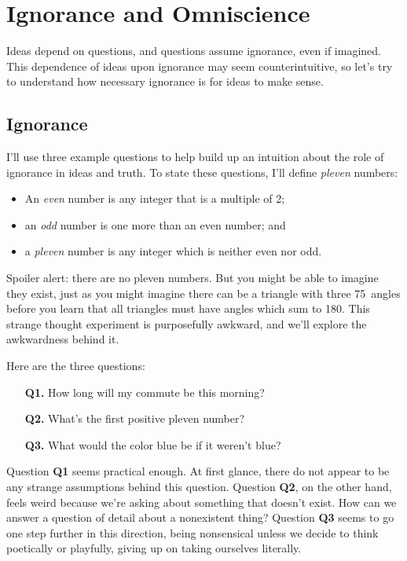 \documentclass[11pt, oneside]{article}
\theoremstyle{argtstyle}
\begin{document}
%
%
%
%
%


\section{Ignorance and Omniscience}

Ideas depend on questions,
and questions assume ignorance,
even if imagined.
This dependence of ideas upon ignorance
may seem counterintuitive, so
let's try to understand how necessary ignorance
is for ideas to make sense.

\subsection{Ignorance}

I'll use three example questions
to help build up an intuition about the role of
ignorance in ideas and truth.
To state these questions, I'll define
{\em pleven} numbers:
\begin{itemize}
    \item An {\em even} number is any integer that is a multiple of 2;
    \item an {\em odd} number is one more than an even number; and
    \item a {\em pleven} number is any integer which is neither even nor odd.
\end{itemize}
Spoiler
alert: there are no pleven numbers.
But you might be able to imagine they exist, just as you might imagine there can
be a triangle with three 75\degree\ angles before you learn that all triangles
must have angles which sum to 180\degree.
This strange thought experiment is purposefully awkward, and we'll
explore the awkwardness behind it.

Here are the three questions:
\begin{enumerate}
    \item[{\bf Q1.}] How long will my commute be this morning?
    \item[{\bf Q2.}] What's the first positive pleven number?
    \item[{\bf Q3.}] What would the color blue be if it weren't blue?
\end{enumerate}
Question {\bf Q1} seems practical enough. At first glance, there do not appear
to be any strange assumptions behind this question.
Question {\bf Q2}, on the other hand, feels weird because we're asking about
something that doesn't exist. How can we answer a question of detail about a
nonexistent thing? Question {\bf Q3} seems to go one step further in this
direction,
being nonsensical unless we decide to think poetically or
playfully, giving up on taking ourselves literally.
\end{document}
